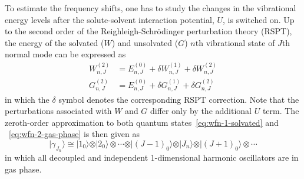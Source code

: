 \documentclass[a4paper,titlepage,twoside,fleqn,12pt]{book}
\begin{document}
\begin{refsection}
To estimate the frequency shifts, one has to study the changes
in the vibrational energy levels after the solute\hyp{}solvent 
interaction potential, $U$, is switched on. Up to the second order
of the Reighleigh\hyp{}Schr{\"o}dinger perturbation theory (RSPT), 
the energy of the solvated ($W$) and unsolvated ($G$) 
$n$th vibrational state of $J$th normal mode can be expressed as
%
\begin{subequations}\label{e:gwlevels}
\begin{align}
W_{n,J}^{(2)} &= E_{n,J}^{(0)} + \delta W_{n,J}^{(1)} + \delta W_{n,J}^{(2)} \\
G_{n,J}^{(2)} &= E_{n,J}^{(0)} + \delta G_{n,J}^{(1)} + \delta G_{n,J}^{(2)}
\end{align}
\end{subequations}
%
in which the $\delta$ symbol denotes the corresponding RSPT correction. Note 
that the perturbations associated with $W$ and $G$ differ only by 
the additional $U$ term.
The zeroth\hyp{}order approximation
to both quantum states~\eqref{eq:wfn-1-solvated} and
~\eqref{eq:wfn-2-gas-phase}
is then given as
%
\begin{equation}  \label{eq:reference_state_vibr}
\vert \gamma_{J_n}   \rangle 
 \cong 
 \vert 1_0 \rangle \otimes 
 \vert 2_0 \rangle \otimes \cdots \otimes
 \vert (J-1)_0 \rangle \otimes
 \vert J_n \rangle \otimes 
 \vert (J+1)_0 \rangle \otimes \cdots 
\end{equation}
%
in which all decoupled and independent 1\hyp{}dimensional harmonic oscillators 
are in gas phase.


\end{refsection}
\end{document}
